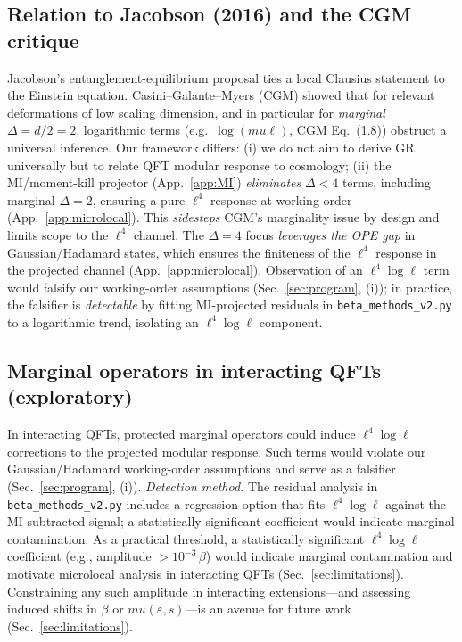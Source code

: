 \documentclass[aps,prd,onecolumn,superscriptaddress,nofootinbib]{revtex4-2}
\def\mu{mu}%
\begin{document}
\subsection{Relation to Jacobson (2016) and the CGM critique}
Jacobson’s entanglement-equilibrium proposal \cite{Jacobson2016} ties a local Clausius statement to the Einstein equation. Casini–Galante–Myers (CGM) \cite{CasiniGalanteMyers2016} showed that for relevant deformations of low scaling dimension, and in particular for \emph{marginal} \(\Delta=d/2=2\), logarithmic terms (e.g.\ \(\log(\mu\ell)\), CGM Eq.~(1.8)) obstruct a universal inference. Our framework differs: (i) we do not aim to derive GR universally but to relate QFT modular response to cosmology; (ii) the MI/moment-kill projector (App.~\ref{app:MI}) \emph{eliminates} \(\Delta<4\) terms, including marginal \(\Delta=2\), ensuring a pure \(\ell^4\) response at working order (App.~\ref{app:microlocal}). This \emph{sidesteps} CGM’s marginality issue by design and limits scope to the \(\ell^4\) channel. The \(\Delta=4\) focus \emph{leverages the OPE gap} in Gaussian/Hadamard states, which ensures the finiteness of the \(\ell^4\) response in the projected channel (App.~\ref{app:microlocal}). Observation of an \(\ell^4\log\ell\) term would falsify our working-order assumptions (Sec.~\ref{sec:program}, (i)); in practice, the falsifier is \emph{detectable} by fitting MI-projected residuals in \texttt{beta\_methods\_v2.py} to a logarithmic trend, isolating an \(\ell^4\log\ell\) component.

\subsection{Marginal operators in interacting QFTs (exploratory)}
In interacting QFTs, protected marginal operators could induce \(\ell^4\log\ell\) corrections to the projected modular response. Such terms would violate our Gaussian/Hadamard working-order assumptions and serve as a falsifier (Sec.~\ref{sec:program}, (i)). \emph{Detection method.} The residual analysis in \texttt{beta\_methods\_v2.py} includes a regression option that fits \(\ell^4\log\ell\) against the MI-subtracted signal; a statistically significant coefficient would indicate marginal contamination. As a practical threshold, a statistically significant \(\ell^4\log\ell\) coefficient (e.g., amplitude \(>10^{-3}\,\beta\)) would indicate marginal contamination and motivate microlocal analysis in interacting QFTs (Sec.~\ref{sec:limitations}). Constraining any such amplitude in interacting extensions—and assessing induced shifts in \(\beta\) or \(\mu(\varepsilon,s)\)—is an avenue for future work (Sec.~\ref{sec:limitations}).
\end{document}
